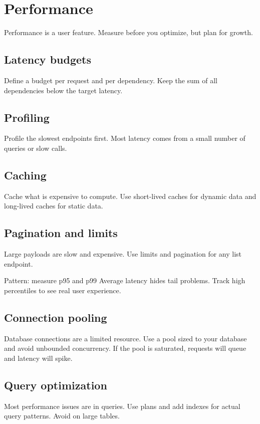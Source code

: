 \chapter{Performance}

Performance is a user feature.
Measure before you optimize, but plan for growth.

\section{Latency budgets}
Define a budget per request and per dependency.
Keep the sum of all dependencies below the target latency.

\section{Profiling}
Profile the slowest endpoints first.
Most latency comes from a small number of queries or slow calls.

\section{Caching}
Cache what is expensive to compute.
Use short-lived caches for dynamic data and long-lived caches for static data.

\section{Pagination and limits}
Large payloads are slow and expensive.
Use limits and pagination for any list endpoint.

\begin{patternbox}{Pattern: measure p95 and p99}
Average latency hides tail problems.
Track high percentiles to see real user experience.
\end{patternbox}

\section{Connection pooling}
Database connections are a limited resource.
Use a pool sized to your database and avoid unbounded concurrency.
If the pool is saturated, requests will queue and latency will spike.

\section{Query optimization}
Most performance issues are in queries.
Use  plans and add indexes for actual query patterns.
Avoid  on large tables.


